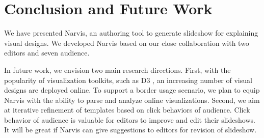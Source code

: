 \section{Conclusion and Future Work}
We have presented Narvis, an authoring tool to generate slideshow for explaining visual designs. We developed Narvis based on our close collaboration with two editors and seven audience. 

In future work, we envision two main research directions. First, with the popularity of visualization toolkits, such as D3 , an increasing number of visual designs are deployed online. To support a border usage scenario, we plan to equip Narvis with the ability to parse and analyze online visualizations. 
Second, we aim at iterative refinement of templates based on click behaviors of audience. Click behavior of audience is valuable for editors to improve and edit their slideshows.  
It will be great if Narvis can give suggestions to editors for revision of slideshow. 

